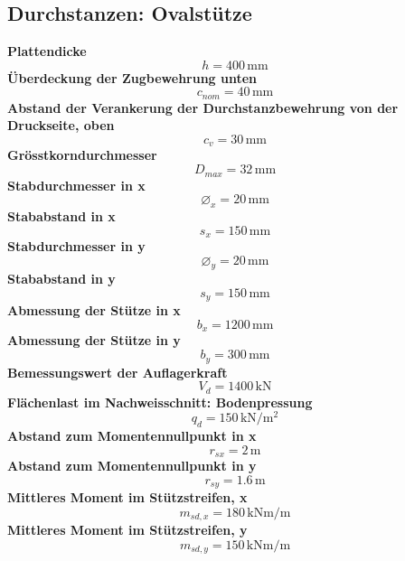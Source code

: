 \documentclass[11pt,a4paper]{article}
\begin{document}
\subsection{Durchstanzen: Ovalstütze}
\noindent\textbf{Plattendicke}
\begin{equation*}
h = 400\,\mathrm{mm}
\end{equation*}
\noindent\textbf{Überdeckung der Zugbewehrung unten}
\begin{equation*}
c_{nom} = 40\,\mathrm{mm}
\end{equation*}
\noindent\textbf{Abstand der Verankerung der Durchstanzbewehrung von der Druckseite, oben}
\begin{equation*}
c_v = 30\,\mathrm{mm}
\end{equation*}
\noindent\textbf{Grösstkorndurchmesser}
\begin{equation*}
D_{max} = 32\,\mathrm{mm}
\end{equation*}
\noindent\textbf{Stabdurchmesser in x}
\begin{equation*}
\varnothing_x = 20\,\mathrm{mm}
\end{equation*}
\noindent\textbf{Stababstand in x}
\begin{equation*}
s_x = 150\,\mathrm{mm}
\end{equation*}
\noindent\textbf{Stabdurchmesser in y}
\begin{equation*}
\varnothing_y = 20\,\mathrm{mm}
\end{equation*}
\noindent\textbf{Stababstand in y}
\begin{equation*}
s_y = 150\,\mathrm{mm}
\end{equation*}
\noindent\textbf{Abmessung der Stütze in x}
\begin{equation*}
b_x = 1200\,\mathrm{mm}
\end{equation*}
\noindent\textbf{Abmessung der Stütze in y}
\begin{equation*}
b_y = 300\,\mathrm{mm}
\end{equation*}
\noindent\textbf{Bemessungswert der Auflagerkraft}
\begin{equation*}
V_d = 1400\,\mathrm{kN}
\end{equation*}
\noindent\textbf{Flächenlast im Nachweisschnitt: Bodenpressung}
\begin{equation*}
q_d = 150\,\mathrm{kN}/\mathrm{m}^{2}
\end{equation*}
\noindent\textbf{Abstand zum Momentennullpunkt in x}
\begin{equation*}
r_{sx} = 2\,\mathrm{m}
\end{equation*}
\noindent\textbf{Abstand zum Momentennullpunkt in y}
\begin{equation*}
r_{sy} = 1.6\,\mathrm{m}
\end{equation*}
\noindent\textbf{Mittleres Moment im Stützstreifen, x}
\begin{equation*}
m_{sd,x} = 180\,\mathrm{kNm}/\mathrm{m}
\end{equation*}
\noindent\textbf{Mittleres Moment im Stützstreifen, y}
\begin{equation*}
m_{sd,y} = 150\,\mathrm{kNm}/\mathrm{m}
\end{equation*}
\end{document}
